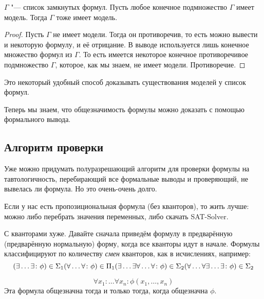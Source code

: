 \begin{theorem}
	$\Gamma$ "--- список замкнутых формул.
	Пусть любое конечное подмножество $\Gamma$ имеет модель.
	Тогда $\Gamma$ тоже имеет модель.
\end{theorem}
\begin{proof}
	Пусть $\Gamma$ не имеет модели.
	Тогда он противоречив, то есть можно вывести и некоторую формулу, и её отрицание.
	В выводе используется лишь конечное множество формул из $\Gamma$.
	То есть имеется некоторое конечное противоречивое подмножество $\Gamma$,
	которое, как мы знаем, не имеет модели.
	Противоречие.
\end{proof}
\begin{Rem}
	Это некоторый удобный способ доказывать существования моделей у список формул.
\end{Rem}

\begin{Rem}
	Теперь мы знаем, что общезначимость формулы можно доказать с помощью формального вывода.
\end{Rem}

\subsection{Алгоритм проверки}
Уже можно придумать полуразрешающий алгоритм для проверки формулы на тавтологичность,
перебирающий все формальные выводы и проверяющий, не вывелась ли формула.
Но это очень-очень долго.

Если у нас есть пропозициональная формула (без кванторов), то жить лучше: можно либо перебрать
значения переменных, либо скачать SAT-Solver.

С кванторами хуже.
Давайте сначала приведём формулу в предварённую (предварённую нормальную) форму, когда
все кванторы идут в начале.
Формулы классифицируют по количеству \textsl{смен} кванторов, как в исчислениях, например:
\[
	(\exists \dots \exists \colon \phi) \in \Sigma_1 \\
	(\forall \dots \forall \colon \phi) \in \Pi_1 \\
	(\exists \dots \exists \forall \dots \forall \colon \phi) \in \Sigma_2 \\
	(\forall \dots \forall \exists \dots \exists \colon \phi) \in \Sigma_2 \\
\]

\begin{assertion}
	\[
		\forall x_1 \colon \dots \forall x_n \colon \phi(x_1, \dots, x_n)
	\]
	Эта формула общезначна тогда и только тогда, когда общезначна $\phi$.
\end{assertion}

